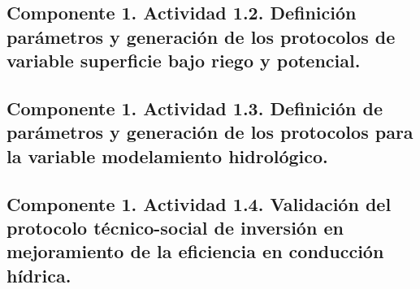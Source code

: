\documentclass[]{article}
\begin{document}
\subsection{Componente 1. Actividad 1.2. Definición parámetros y generación de los protocolos de variable superficie bajo riego y potencial.}

\subsection{Componente 1. Actividad 1.3. Definición de parámetros y generación de los protocolos para la variable modelamiento hidrológico.}


\subsection{Componente 1. Actividad 1.4. Validación del protocolo técnico-social de inversión en mejoramiento de la eficiencia en conducción hídrica.}
\end{document}
